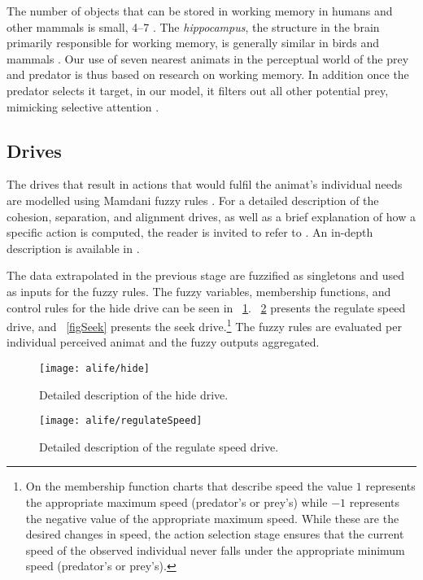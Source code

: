 \begin{subappendices}
The number of objects that can be stored in working memory in humans and other mammals is small, 4--7 \cite{ballerini2008interaction,engle1999individual}. The \emph{hippocampus}, the structure in the brain primarily responsible for working memory, is generally similar in birds and mammals \cite{sherry1989hippocampus}. Our use of seven nearest animats in the perceptual world of the prey and predator is thus based on research on working memory. In addition once the predator selects it target, in our model, it filters out all other potential prey, mimicking selective attention \cite{wiederman2012selective}.

\subsection{Drives}
The drives that result in actions that would fulfil the animat's individual needs are modelled using Mamdani fuzzy rules \cite{mamdani1974application}. For a detailed description of the cohesion, separation, and alignment drives, as well as a brief explanation of how a specific action is computed, the reader is invited to refer to \cite{lebarbajec2005simulating}. An in-depth description is available in \cite{lebarbajec2005fuzzy}. 

The data extrapolated in the previous stage are fuzzified as singletons and used as inputs for the fuzzy rules. The fuzzy variables, membership functions, and control rules for the hide drive can be seen in \figurename~\ref{figHide}. \figurename~\ref{figRegulateSpeed} presents the regulate speed drive, and \figurename~\ref{figSeek} presents the seek drive.\footnote{On the membership function charts that describe speed the value $1$ represents the appropriate maximum speed (predator's or prey's) while $-1$ represents the negative value of the appropriate maximum speed. While these are the desired changes in speed, the action selection stage ensures that the current speed of the observed individual never falls under the appropriate minimum speed (predator's or prey's).} The fuzzy rules are evaluated per individual perceived animat and the fuzzy outputs aggregated. 

\begin{figure}
	\texttt{[image: alife/hide]}
	\caption{Detailed description of the hide drive.}
	\label{figHide}
\end{figure}

\begin{figure}
	\parbox[c][.33\textheight]{\figurewidth}{\texttt{[image: alife/regulateSpeed]}}
	\caption{Detailed description of the regulate speed drive.}
	\label{figRegulateSpeed}
\end{figure}


\end{subappendices}

